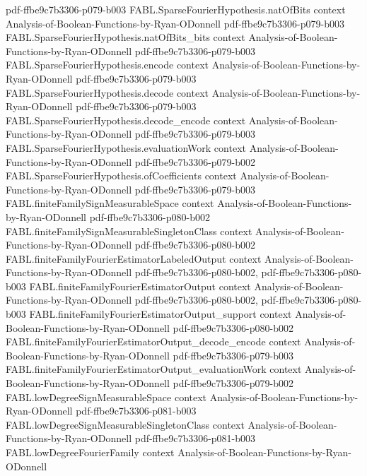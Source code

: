 \begin{theorem}
  {pdf-ffbe9c7b3306-p079-b003}
\proofstep
  {FABL.SparseFourierHypothesis.natOfBits}
  {context}
  {Analysis-of-Boolean-Functions-by-Ryan-ODonnell}
  {pdf-ffbe9c7b3306-p079-b003}
\proofstep
  {FABL.SparseFourierHypothesis.natOfBits_bits}
  {context}
  {Analysis-of-Boolean-Functions-by-Ryan-ODonnell}
  {pdf-ffbe9c7b3306-p079-b003}
\proofstep
  {FABL.SparseFourierHypothesis.encode}
  {context}
  {Analysis-of-Boolean-Functions-by-Ryan-ODonnell}
  {pdf-ffbe9c7b3306-p079-b003}
\proofstep
  {FABL.SparseFourierHypothesis.decode}
  {context}
  {Analysis-of-Boolean-Functions-by-Ryan-ODonnell}
  {pdf-ffbe9c7b3306-p079-b003}
\proofstep
  {FABL.SparseFourierHypothesis.decode_encode}
  {context}
  {Analysis-of-Boolean-Functions-by-Ryan-ODonnell}
  {pdf-ffbe9c7b3306-p079-b003}
\proofstep
  {FABL.SparseFourierHypothesis.evaluationWork}
  {context}
  {Analysis-of-Boolean-Functions-by-Ryan-ODonnell}
  {pdf-ffbe9c7b3306-p079-b002}
\proofstep
  {FABL.SparseFourierHypothesis.ofCoefficients}
  {context}
  {Analysis-of-Boolean-Functions-by-Ryan-ODonnell}
  {pdf-ffbe9c7b3306-p079-b003}
\proofstep
  {FABL.finiteFamilySignMeasurableSpace}
  {context}
  {Analysis-of-Boolean-Functions-by-Ryan-ODonnell}
  {pdf-ffbe9c7b3306-p080-b002}
\proofstep
  {FABL.finiteFamilySignMeasurableSingletonClass}
  {context}
  {Analysis-of-Boolean-Functions-by-Ryan-ODonnell}
  {pdf-ffbe9c7b3306-p080-b002}
\proofstep
  {FABL.finiteFamilyFourierEstimatorLabeledOutput}
  {context}
  {Analysis-of-Boolean-Functions-by-Ryan-ODonnell}
  {pdf-ffbe9c7b3306-p080-b002,
    pdf-ffbe9c7b3306-p080-b003}
\proofstep
  {FABL.finiteFamilyFourierEstimatorOutput}
  {context}
  {Analysis-of-Boolean-Functions-by-Ryan-ODonnell}
  {pdf-ffbe9c7b3306-p080-b002,
    pdf-ffbe9c7b3306-p080-b003}
\proofstep
  {FABL.finiteFamilyFourierEstimatorOutput_support}
  {context}
  {Analysis-of-Boolean-Functions-by-Ryan-ODonnell}
  {pdf-ffbe9c7b3306-p080-b002}
\proofstep
  {FABL.finiteFamilyFourierEstimatorOutput_decode_encode}
  {context}
  {Analysis-of-Boolean-Functions-by-Ryan-ODonnell}
  {pdf-ffbe9c7b3306-p079-b003}
\proofstep
  {FABL.finiteFamilyFourierEstimatorOutput_evaluationWork}
  {context}
  {Analysis-of-Boolean-Functions-by-Ryan-ODonnell}
  {pdf-ffbe9c7b3306-p079-b002}
\proofstep
  {FABL.lowDegreeSignMeasurableSpace}
  {context}
  {Analysis-of-Boolean-Functions-by-Ryan-ODonnell}
  {pdf-ffbe9c7b3306-p081-b003}
\proofstep
  {FABL.lowDegreeSignMeasurableSingletonClass}
  {context}
  {Analysis-of-Boolean-Functions-by-Ryan-ODonnell}
  {pdf-ffbe9c7b3306-p081-b003}
\proofstep
  {FABL.lowDegreeFourierFamily}
  {context}
  {Analysis-of-Boolean-Functions-by-Ryan-ODonnell}

\end{theorem}
